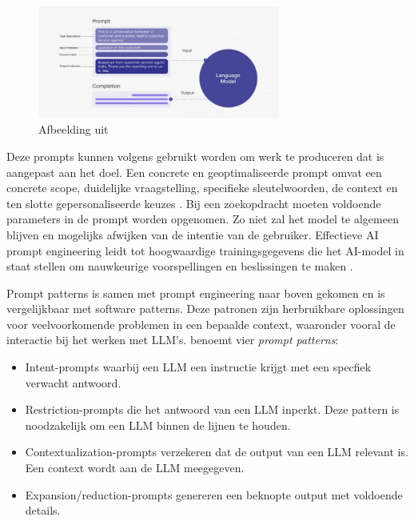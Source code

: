 \begin{figure}
	\begin{center}
		\includegraphics[width=8cm]{img/prompt-engineering-medium.png}
	\end{center}
	\caption{Afbeelding uit \textcite{McFarland2023}}
	\label{img:prompt-engineering}
\end{figure}

Deze prompts kunnen volgens \textcite{Liu2020} gebruikt worden om werk te produceren dat is aangepast aan het doel. Een concrete en geoptimaliseerde prompt omvat een concrete scope, duidelijke vraagstelling, specifieke sleutelwoorden, de context en ten slotte gepersonaliseerde keuzes \autocite{McFarland2023}. Bij een zoekopdracht moeten voldoende parameters in de prompt worden opgenomen. Zo niet zal het model te algemeen blijven en mogelijks afwijken van de intentie van de gebruiker. Effectieve AI prompt engineering leidt tot hoogwaardige trainingsgegevens die het AI-model in staat stellen om nauwkeurige voorspellingen en beslissingen te maken \autocite{Liu2020}. 

\medspace

Prompt patterns is samen met prompt engineering naar boven gekomen en is vergelijkbaar met software patterns. Deze patronen zijn herbruikbare oplossingen voor veelvoorkomende problemen in een bepaalde context, waaronder vooral de interactie bij het werken met LLM's. \textcite{White2023} benoemt vier \textit{prompt patterns}:

\begin{itemize}
	\item	Intent-prompts waarbij een LLM een instructie krijgt met een specfiek verwacht antwoord.
	\item	Restriction-prompts die het antwoord van een LLM inperkt. Deze pattern is noodzakelijk om een LLM binnen de lijnen te houden.
	\item 	Contextualization-prompts verzekeren dat de output van een LLM relevant is. Een context wordt aan de LLM meegegeven.
	\item	Expansion/reduction-prompts genereren een beknopte output met voldoende details. 
\end{itemize}

